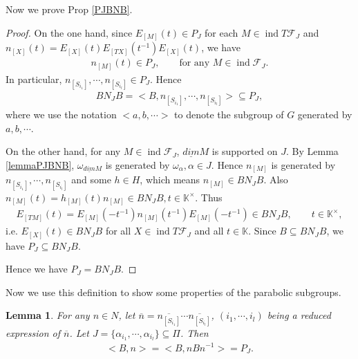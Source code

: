 \documentclass[12pt]{amsart}
\newtheorem{lemma}[theorem]{Lemma}
\begin{document}
Now we prove Prop \ref{PJBNB}.

\begin{proof}
    On the one hand, since $E_{[M]}(t)\in P_J$ for each $M\in \operatorname{ind}T\mathcal{F}_J$ and $n_{[X]}(t) = E_{[X]}(t) E_{[TX]}(t^{-1}) E_{[X]}(t)$, we have 
    \begin{align*}
        n_{[M]}(t) \in P_J, \qquad \text{for any }  M\in \operatorname{ind}\mathcal{F}_J.
    \end{align*}
    In particular, $n_{[S_{i_1}]},\cdots,n_{[S_{i_l}]} \in P_J$.
    Hence 
    \begin{align*}
        BN_JB = <B,n_{[S_{i_1}]},\cdots,n_{[S_{i_l}]} > \subseteq  P_J,
    \end{align*}
    where we use the notation $<a,b,\cdots>$ to denote the subgroup of $G$ generated by $a,b,\cdots$.   

    On the other hand, for any $M\in \operatorname{ind}\mathcal{F}_J$, $\underline{dim}M$ is supported on $J$.
    By Lemma \ref{lemmaPJBNB}, $\omega_{\underline{dim}M}$ is generated by  $\omega_{\alpha},\alpha \in J$.
    Hence $n_{[M]}$ is generated by $n_{[S_{i_1}]},\cdots,n_{[S_{i_l}]}$ and some $h\in H$, which means $n_{[M]}\in BN_JB$.
    Also $n_{[M]}(t) = h_{[M]}(t)n_{[M]}\in BN_JB,  t\in \mathbb{K}^{\times}$.
    Thus
    \begin{align*}
        E_{[TM]}(t) = E_{[M]}(-t^{-1})n_{[M]}(t^{-1})E_{[M]}(-t^{-1}) \in BN_JB, \qquad t\in \mathbb{K}^{\times},
    \end{align*}
    i.e. $E_{[X]}(t) \in BN_JB$ for all $X\in \operatorname{ind}T\mathcal{F}_J$ and all $t\in \mathbb{K}$.
    Since $B\subseteq  BN_JB$, we have $P_J\subseteq  BN_JB$.

    Hence we have $P_J = BN_JB$.
\end{proof}

Now we use this definition to show some properties of the parabolic subgroups.

\begin{lemma}\label{nBnPJ}
    For any $n\in N$, let $\overline{n} = \overline{n_{[S_{i_1}]}} \cdots \overline{n_{[S_{i_l}]}}$, $(i_1,\cdots,i_l)$ being a reduced expression of $\overline{n}$.
    Let $J = \{ \alpha_{i_1}, \cdots, \alpha_{i_l} \}\subseteq \Pi$.
    Then 
    \begin{align*}
        <B,n> = <B,nBn^{-1}> = P_J.
    \end{align*}
\end{lemma}
\end{document}
